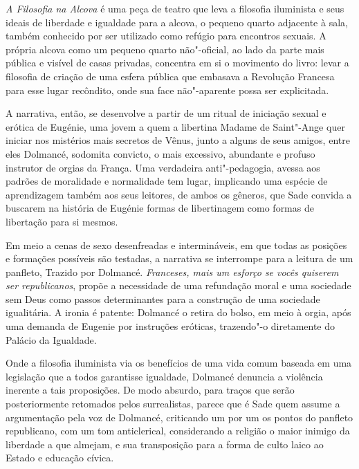 \emph{A Filosofia na Alcova} é uma peça de teatro que leva a filosofia
iluminista e seus ideais de liberdade e igualdade para a alcova, o
pequeno quarto adjacente à sala, também conhecido por ser utilizado como
refúgio para encontros sexuais. A própria alcova como um pequeno quarto
não"-oficial, ao lado da parte mais pública e visível de casas privadas,
concentra em si o movimento do livro: levar a filosofia de criação de
uma esfera pública que embasava a Revolução Francesa para esse lugar
recôndito, onde sua face não"-aparente possa ser explicitada.

A narrativa, então, se desenvolve a partir de um ritual de iniciação
sexual e erótica de Eugénie, uma jovem a quem a libertina Madame de
Saint"-Ange quer iniciar nos mistérios mais secretos de Vênus, junto a
alguns de seus amigos, entre eles Dolmancé, sodomita convicto, o mais
excessivo, abundante e profuso instrutor de orgias da França. Uma
verdadeira anti"-pedagogia, avessa aos padrões de moralidade e
normalidade tem lugar, implicando uma espécie de aprendizagem também aos
seus leitores, de ambos os gêneros, que Sade convida a buscarem na
história de Eugénie formas de libertinagem como formas de libertação
para si mesmos.

Em meio a cenas de sexo desenfreadas e intermináveis, em que todas as
posições e formações possíveis são testadas, a narrativa se interrompe
para a leitura de um panfleto, Trazido por Dolmancé. \emph{Franceses,
mais um esforço se vocês quiserem ser republicanos}, propõe a
necessidade de uma refundação moral e uma sociedade sem Deus como passos
determinantes para a construção de uma sociedade igualitária. A ironia é
patente: Dolmancé o retira do bolso, em meio à orgia, após uma demanda
de Eugenie por instruções eróticas, trazendo"-o diretamente do Palácio da
Igualdade.

Onde a filosofia iluminista via os benefícios de uma vida comum baseada
em uma legislação que a todos garantisse igualdade, Dolmancé denuncia a
violência inerente a tais proposições. De modo absurdo, para traços que
serão posteriormente retomados pelos surrealistas, parece que é Sade
quem assume a argumentação pela voz de Dolmancé, criticando um por um os
pontos do panfleto republicano, com um tom anticlerical, considerando a
religião o maior inimigo da liberdade a que almejam, e sua transposição
para a forma de culto laico ao Estado e educação cívica.

